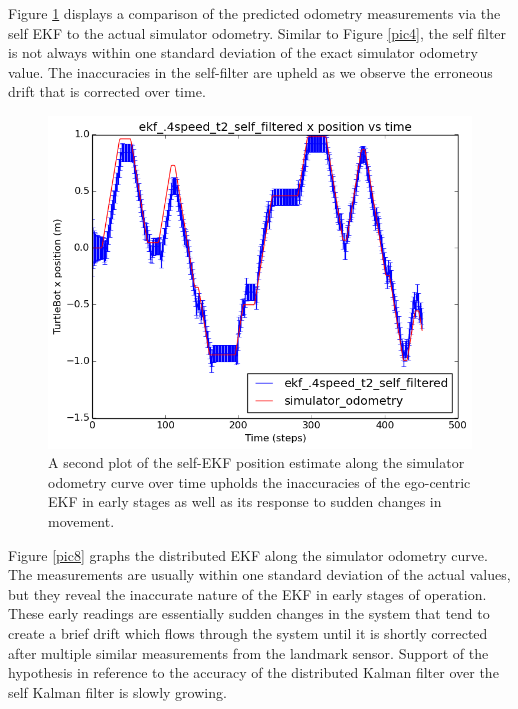 \documentclass[conference]{IEEEtran} \usepackage[T1]{fontenc} \usepackage[backend=biber, style=ieee]{biblatex}
\begin{document}
Figure \ref{pic7} displays a comparison of the predicted odometry measurements via the self EKF to the actual simulator 
odometry. Similar to Figure \ref{pic4}, the self filter is not always within one standard deviation of the exact simulator 
odometry value. The inaccuracies in the self-filter are upheld as we observe the erroneous drift that is corrected over time.

\begin{figure}
\centering 
\includegraphics[scale=.45]{ekf_4speed_t2_self_filtered_pos_err_graph}
\caption {A second plot of the self-EKF position estimate along the simulator odometry curve over time 
upholds the inaccuracies of the ego-centric EKF in early stages as well as its response to sudden changes 
in movement.}
\label{pic7} 
\end{figure}

Figure \ref{pic8} graphs the distributed EKF along the simulator odometry curve. The measurements are usually within one standard 
deviation of the actual values, but they reveal the inaccurate nature of the EKF in early stages of operation. These early readings 
are essentially sudden changes in the system that tend to create a brief drift which flows through the system until it is shortly 
corrected after multiple similar measurements from the landmark sensor. Support of the hypothesis in reference to the accuracy 
of the distributed Kalman filter over the self Kalman filter is slowly growing.
\end{document}
